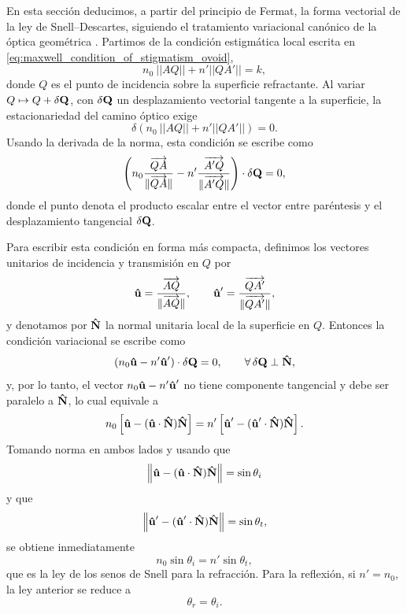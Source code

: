 En esta sección deducimos, a partir del principio de Fermat, la forma vectorial de la ley de Snell--Descartes, siguiendo el tratamiento variacional canónico de la óptica geométrica \cite{bornwolf1999}. Partimos de la condición estigmática local escrita en \eqref{eq:maxwell_condition_of_stigmatism_ovoid},
%
\begin{equation}
    n_0\ || AQ || + n' || QA' || = k,
\end{equation}
%
donde $Q$ es el punto de incidencia sobre la superficie refractante.
Al variar $Q \mapsto Q + \delta \vb{Q}$, con $\delta \vb{Q}$ un desplazamiento vectorial tangente a la superficie, la estacionariedad del camino óptico exige
%
\begin{equation}
    \delta \left(n_0\ || AQ || + n' || QA' ||\right)=0.
\end{equation}
%
Usando la derivada de la norma, esta condición se escribe como
%
\begin{equation}
    \left(
      n_0\frac{\overrightarrow{QA}}{\|\overrightarrow{QA}\|}
      -
      n'\frac{\overrightarrow{A'Q}}{\|\overrightarrow{A'Q}\|}
    \right)\cdot \delta \vb{Q} = 0,
\end{equation}
%
donde el punto denota el producto escalar entre el vector entre paréntesis y el desplazamiento tangencial $\delta \vb{Q}$.

Para escribir esta condición en forma más compacta, definimos los vectores unitarios de incidencia y transmisión en $Q$ por
%
\begin{equation}
  \bm{\hat{\mathbf{u}}} = \frac{\overrightarrow{AQ}}{\|\overrightarrow{AQ}\|},
  \qquad
  \bm{\hat{\mathbf{u}}}' = \frac{\overrightarrow{QA'}}{\|\overrightarrow{QA'}\|},
\end{equation}
%
y denotamos por $\bm{\hat{\mathbf{N}}}$ la normal unitaria local de la superficie en $Q$.
Entonces la condición variacional se escribe como
%
\begin{equation}
    (n_0\bm{\hat{\mathbf{u}}} - n'\bm{\hat{\mathbf{u}}}')\cdot \delta \vb{Q} = 0,
    \qquad \forall\, \delta \vb{Q} \perp \bm{\hat{\mathbf{N}}},
\end{equation}
%
y, por lo tanto, el vector $n_0\bm{\hat{\mathbf{u}}} - n'\bm{\hat{\mathbf{u}}}'$ no tiene componente tangencial y debe ser paralelo a $\bm{\hat{\mathbf{N}}}$, lo cual equivale a
%
\begin{equation}
  n_0\left[\bm{\hat{\mathbf{u}}} - (\bm{\hat{\mathbf{u}}}\cdot\bm{\hat{\mathbf{N}}})\bm{\hat{\mathbf{N}}}\right]
  =
  n'\left[\bm{\hat{\mathbf{u}}}' - (\bm{\hat{\mathbf{u}}}'\cdot\bm{\hat{\mathbf{N}}})\bm{\hat{\mathbf{N}}}\right].
\end{equation}
%
Tomando norma en ambos lados y usando que
%
\begin{equation}
  \left\|\bm{\hat{\mathbf{u}}} - (\bm{\hat{\mathbf{u}}}\cdot\bm{\hat{\mathbf{N}}})\bm{\hat{\mathbf{N}}}\right\|=\sin\theta_i
\end{equation}
%
y que
%
\begin{equation}
  \left\|\bm{\hat{\mathbf{u}}}' - (\bm{\hat{\mathbf{u}}}'\cdot\bm{\hat{\mathbf{N}}})\bm{\hat{\mathbf{N}}}\right\|=\sin\theta_t,
\end{equation}
%
se obtiene inmediatamente
%
\begin{equation}
  n_0\sin\theta_i = n'\sin\theta_t,
\end{equation}
%
que es la ley de los senos de Snell para la refracción. Para la reflexión, si $n'=n_0$, la ley anterior se reduce a
%
\begin{equation}
  \theta_r=\theta_i.
\end{equation}

